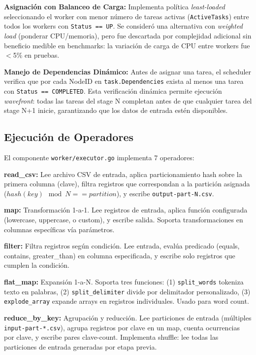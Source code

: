 \documentclass[conference]{IEEEtran}
\begin{document}
\textbf{Asignación con Balanceo de Carga:} Implementa política \emph{least-loaded} seleccionando el worker con menor número de tareas activas (\texttt{ActiveTasks}) entre todos los workers con \texttt{Status == UP}. Se consideró una alternativa con \emph{weighted load} (ponderar CPU/memoria), pero fue descartada por complejidad adicional sin beneficio medible en benchmarks: la variación de carga de CPU entre workers fue $<$5\% en pruebas.

\textbf{Manejo de Dependencias Dinámico:} Antes de asignar una tarea, el scheduler verifica que por cada NodeID en \texttt{task.Dependencies} exista al menos una tarea con \texttt{Status == COMPLETED}. Esta verificación dinámica permite ejecución \emph{wavefront}: todas las tareas del stage N completan antes de que cualquier tarea del stage N+1 inicie, garantizando que los datos de entrada estén disponibles.

\subsection{Ejecución de Operadores}

El componente \texttt{worker/executor.go} implementa 7 operadores:

\textbf{read\_csv:} Lee archivo CSV de entrada, aplica particionamiento hash sobre la primera columna (clave), filtra registros que correspondan a la partición asignada ($hash(key) \mod N == partition$), y escribe \texttt{output-part-N.csv}.

\textbf{map:} Transformación 1-a-1. Lee registros de entrada, aplica función configurada (lowercase, uppercase, o custom), y escribe salida. Soporta transformaciones en columnas específicas vía parámetros.

\textbf{filter:} Filtra registros según condición. Lee entrada, evalúa predicado (equals, contains, greater\_than) en columna especificada, y escribe solo registros que cumplen la condición.

\textbf{flat\_map:} Expansión 1-a-N. Soporta tres funciones: (1) \texttt{split\_words} tokeniza texto en palabras, (2) \texttt{split\_delimiter} divide por delimitador personalizado, (3) \texttt{explode\_array} expande arrays en registros individuales. Usado para word count.

\textbf{reduce\_by\_key:} Agrupación y reducción. Lee particiones de entrada (múltiples \texttt{input-part-*.csv}), agrupa registros por clave en un map, cuenta ocurrencias por clave, y escribe pares clave-count. Implementa shuffle: lee todas las particiones de entrada generadas por etapa previa.
\end{document}
